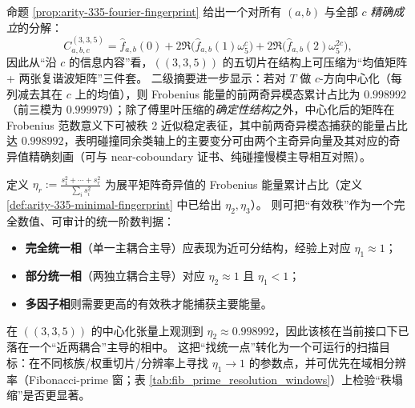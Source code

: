 \begin{remark}\label{rem:arity-335-low-rank-source}
命题 \ref{prop:arity-335-fourier-fingerprint} 给出一个对所有 $(a,b)$ 与全部 $c$ \emph{精确成立}的分解：
\[
C^{(3,3,5)}_{a,b,c}
=\widehat f_{a,b}(0)+2\Re\bigl(\widehat f_{a,b}(1)\omega_5^{c}\bigr)+2\Re\bigl(\widehat f_{a,b}(2)\omega_5^{2c}\bigr),
\]
因此从“沿 $c$ 的信息内容”看，\(((3,3,5))\) 的五切片在结构上可压缩为“均值矩阵 + 两张复谐波矩阵”三件套。
二级摘要进一步显示：若对 $T$ 做 $c$-方向中心化（每列减去其在 $c$ 上的均值），则 Frobenius 能量的前两奇异模态累计占比为 $0.998992$（前三模为 $0.999979$）；除了傅里叶压缩的\emph{确定性结构}之外，中心化后的矩阵在 Frobenius 范数意义下可被秩 2 近似稳定表征，其中前两奇异模态捕获的能量占比达 $0.998992$，表明碰撞同余类轴上的主要变分可由两个主奇异向量及其对应的奇异值精确刻画（可与 near-coboundary 证书、纯碰撞慢模主导相互对照）。
\end{remark}

\begin{remark}\label{rem:effective-rank-unification-order}
定义 \(\eta_r:=\frac{s_1^2+\cdots+s_r^2}{\sum_i s_i^2}\) 为展平矩阵奇异值的 Frobenius 能量累计占比（定义 \ref{def:arity-335-minimal-fingerprint} 中已给出 \(\eta_2,\eta_3\)）。
则可把“有效秩”作为一个完全数值、可审计的统一阶数判据：
\begin{itemize}
  \item \textbf{完全统一相}（单一主耦合主导）应表现为近可分结构，经验上对应 \(\eta_1\approx 1\)；
  \item \textbf{部分统一相}（两独立耦合主导）对应 \(\eta_2\approx 1\) 且 \(\eta_1<1\)；
  \item \textbf{多因子相}则需要更高的有效秩才能捕获主要能量。
\end{itemize}
在 \(((3,3,5))\) 的中心化张量上观测到 \(\eta_2\approx 0.998992\)，因此该核在当前接口下已落在一个“近两耦合”主导的相中。
这把“找统一点”转化为一个可运行的扫描目标：在不同核族/权重切片/分辨率上寻找 \(\eta_1\to 1\) 的参数点，并可优先在域相分辨率（Fibonacci-prime 窗；表 \ref{tab:fib_prime_resolution_windows}）上检验“秩塌缩”是否更显著。
\end{remark}

